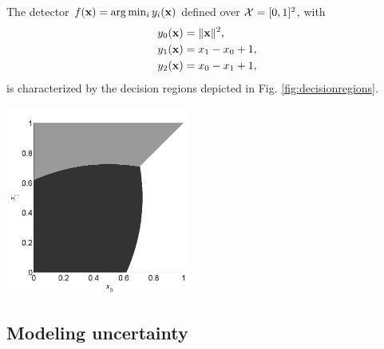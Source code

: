 \begin{example}
\label{ex:decisionregions}
The detector $f({\bf x}) = \arg\min_i y_i({\bf x})$ defined over ${\cal X} = [0,1]^2$, with
\begin{align}
y_0({\bf x}) & = \|{\bf x}\|^2, \nonumber \\
y_1({\bf x}) & = x_1 - x_0 +1, \nonumber \\
y_2({\bf x}) & = x_0 - x_1 + 1, \nonumber 
\end{align}
is characterized by the decision regions depicted in Fig. \ref{fig:decisionregions}.

\begin{center}
\includegraphics[width=6cm]{Figures//DecRegEx.pdf}
\end{center}
    
\end{example}

\subsection{Modeling uncertainty}
\label{subsec:statistical_info}

